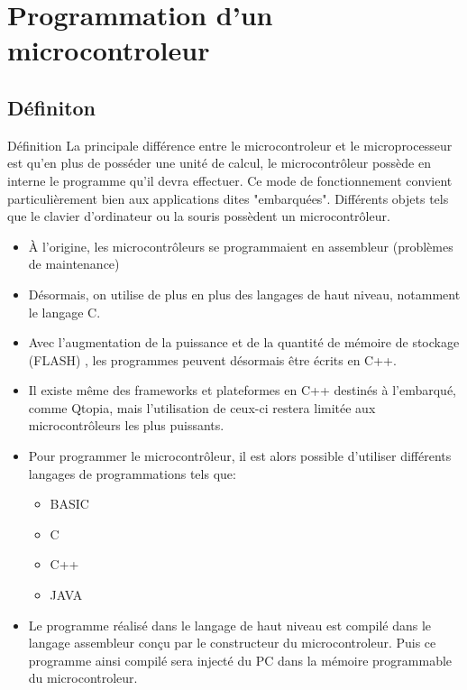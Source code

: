 \documentclass{beamer}
\begin{document}
\section {Programmation d'un microcontroleur}
\subsection{Définiton}
\begin{frame}
\begin{block}{Définition}
 La principale différence entre le microcontroleur et le microprocesseur est qu'en plus de posséder une unité de calcul, le microcontrôleur possède en interne le programme qu'il devra effectuer.
 Ce mode de fonctionnement convient particulièrement bien aux applications dites "embarquées".
 Différents objets  tels que le clavier d'ordinateur ou la souris possèdent un microcontrôleur.
\end{block}
\end{frame}
\begin{frame}
\begin{itemize}
\item À l'origine, les microcontrôleurs se programmaient en assembleur (problèmes de maintenance)
\item Désormais, on utilise de plus en plus des langages de haut niveau, notamment le langage C.
\item Avec l’augmentation de la puissance et de la quantité de mémoire de stockage (FLASH) , les programmes  peuvent désormais être écrits en C++. 
\item Il existe même des frameworks et plateformes en C++ destinés à l’embarqué, comme Qtopia, mais l'utilisation de ceux-ci restera limitée aux microcontrôleurs les plus puissants. 
\end{itemize}
\end{frame}
\begin{frame}
\begin{itemize}
\item  Pour programmer le microcontrôleur, il est alors possible d'utiliser différents langages de programmations tels que:
\begin{itemize}
  \item BASIC
  \item C
  \item C++
  \item JAVA
  \end{itemize}
\end{itemize}
\begin{itemize}
  \item Le programme réalisé dans le langage de haut niveau est compilé dans le langage assembleur conçu par le constructeur du microcontroleur. Puis ce programme ainsi compilé sera injecté du PC dans la mémoire programmable du microcontroleur.
\end{itemize}
\end{frame}
\end{document}
